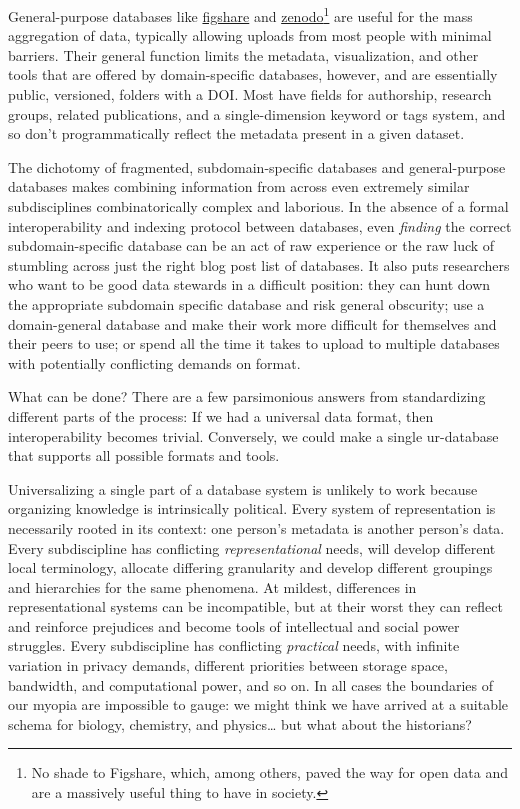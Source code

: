 \documentclass[10pt]{article}
\begin{document}
\begin{multicols}{2}
General-purpose databases like \href{https://figshare.com/}{figshare}
and \href{https://zenodo.org/}{zenodo}\footnote{No shade to Figshare,
  which, among others, paved the way for open data and are a massively
  useful thing to have in society.} are useful for the mass aggregation
of data, typically allowing uploads from most people with minimal
barriers. Their general function limits the metadata, visualization, and
other tools that are offered by domain-specific databases, however, and
are essentially public, versioned, folders with a DOI. Most have fields
for authorship, research groups, related publications, and a
single-dimension keyword or tags system, and so don't programmatically
reflect the metadata present in a given dataset.

The dichotomy of fragmented, subdomain-specific databases and
general-purpose databases makes combining information from across even
extremely similar subdisciplines combinatorically complex and laborious.
In the absence of a formal interoperability and indexing protocol
between databases, even \emph{finding} the correct subdomain-specific
database can be an act of raw experience or the raw luck of stumbling
across just the right blog post list of databases. It also puts
researchers who want to be good data stewards in a difficult position:
they can hunt down the appropriate subdomain specific database and risk
general obscurity; use a domain-general database and make their work
more difficult for themselves and their peers to use; or spend all the
time it takes to upload to multiple databases with potentially
conflicting demands on format.

What can be done? There are a few parsimonious answers from
standardizing different parts of the process: If we had a universal data
format, then interoperability becomes trivial. Conversely, we could make
a single ur-database that supports all possible formats and tools.

Universalizing a single part of a database system is unlikely to work
because organizing knowledge is intrinsically political. Every system of
representation is necessarily rooted in its context: one person's
metadata is another person's data. Every subdiscipline has conflicting
\emph{representational} needs, will develop different local terminology,
allocate differing granularity and develop different groupings and
hierarchies for the same phenomena. At mildest, differences in
representational systems can be incompatible, but at their worst they
can reflect and reinforce prejudices and become tools of intellectual
and social power struggles. Every subdiscipline has conflicting
\emph{practical} needs, with infinite variation in privacy demands,
different priorities between storage space, bandwidth, and computational
power, and so on. In all cases the boundaries of our myopia are
impossible to gauge: we might think we have arrived at a suitable schema
for biology, chemistry, and physics\ldots{} but what about the
historians?


\end{multicols}
\end{document}
